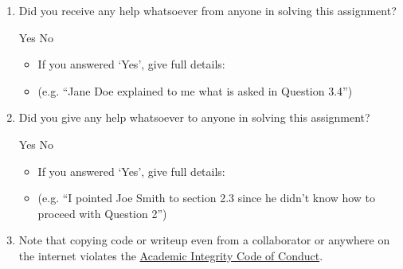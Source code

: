 \begin{enumerate}
    \item Did you receive any help whatsoever from anyone in solving this assignment?
    \begin{checkboxes}
     \choice Yes
     \choice No
    \end{checkboxes}
    \begin{itemize}
        \item If you answered `Yes', give full details:
        \item (e.g. “Jane Doe explained to me what is asked in Question 3.4”)
    \end{itemize}

    \begin{tcolorbox}[fit,height=3cm,blank, borderline={1pt}{-2pt},nobeforeafter]
    \end{tcolorbox}

    \item Did you give any help whatsoever to anyone in solving this assignment?
    \begin{checkboxes}
     \choice Yes
     \choice No\
    \end{checkboxes}
    \begin{itemize}
        \item If you answered `Yes', give full details:
        \item (e.g. “I pointed Joe Smith to section 2.3 since he didn’t know how to proceed with Question 2”)
    \end{itemize}

    \begin{tcolorbox}[fit,height=3cm,blank, borderline={1pt}{-2pt},nobeforeafter]
    \end{tcolorbox}

    \item Note that copying code or writeup even from a collaborator or anywhere on the internet violates the \href{hhttps://www.cmu.edu/policies/student-and-student-life/academic-integrity.html}{Academic Integrity Code of Conduct}.
\end{enumerate}

